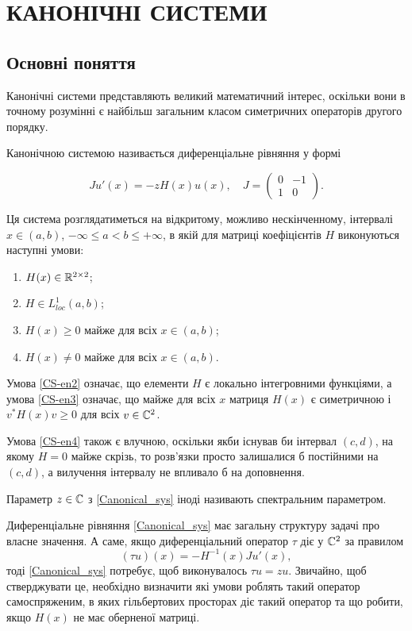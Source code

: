 \section{КАНОНІЧНІ СИСТЕМИ}

\subsection{Основні поняття}

Канонічні системи представляють великий математичний інтерес, оскільки вони в точному розумінні є найбільш загальним класом симетричних операторів другого порядку.\cite{Remling2018}

Канонічною системою називається диференціальне рівняння у формі

\begin{equation} \label{Canonical_sys}
	Ju'(x) = -zH(x)u(x), \quad 
	J=
	\begin{pmatrix}
		0 & -1\\
		1 & 0
	\end{pmatrix}.
\end{equation}

Ця система розглядатиметься на відкритому, можливо нескінченному, інтервалі $x\in (a,b)$, $-\infty\le a<b \le +\infty$, в якій для матриці коефіцієнтів $H$ виконуються наступні умови:
\begin{enumerate} 
	\item $H(x) \in \mathbb{R}^{2\times 2}$;
	\item $H \in L^1_{loc}(a,b)$; \label{CS-en2}
	\item $H(x)\ge 0 \text{ майже для всіх } x\in(a,b)$; \label{CS-en3}
	\item $H(x)\ne 0 \text{ майже для всіх } x\in(a,b)$. \label{CS-en4}
\end{enumerate}

Умова \eqref{CS-en2} означає, що елементи $H$ є локально інтегровними функціями, а умова \eqref{CS-en3} означає, що майже для всіх $x$ матриця $H(x)$ є симетричною і $v^*H(x)v\ge 0$ для всіх $v\in\mathbb{C}^2$.

Умова \eqref{CS-en4} також є влучною, оскільки якби існував би інтервал $(c,d)$, на якому $H = 0$ майже скрізь, то розв'язки просто залишалися б постійними на $(c, d)$, а вилучення інтервалу не впливало б на доповнення.

Параметр $z\in\mathbb{C}$ з \eqref{Canonical_sys} іноді називають спектральним параметром.

Диференціальне рівняння \eqref{Canonical_sys} має загальну структуру задачі про власне значення. А саме, якщо диференціальний оператор $\tau$ діє у $\mathbb{C}^2$ за правилом 
\begin{equation*}
 	(\tau u)(x) = -H^{-1}(x)Ju'(x),
\end{equation*}
тоді \eqref{Canonical_sys} потребує, щоб виконувалось $\tau u=zu$. Звичайно, щоб стверджувати це, необхідно визначити які умови роблять такий оператор самоспряженим, в яких гільбертових просторах діє такий оператор та що робити, якщо $H(x)$ не має оберненої матриці.

